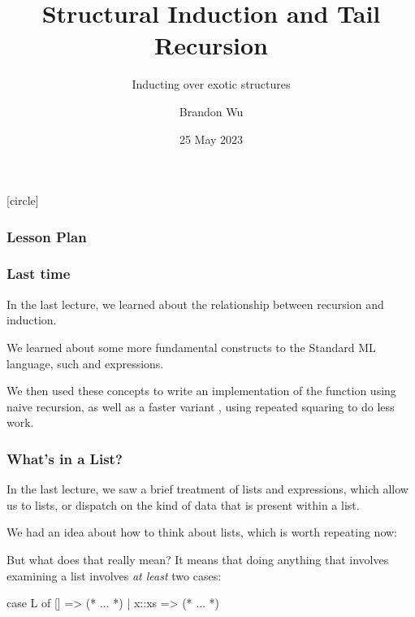 \documentclass[aspectratio=169, handout]{beamer}
\title{Structural Induction and Tail Recursion} %
\subtitle{Inducting over exotic structures} %
\date{25 May 2023} %
\author{Brandon Wu} %
\newif\ifcolorlambda
\begin{document}
\ifweb
\renewcommand{\pause}{}
\fi

[circle]

{
\begin{frame}[plain]
\colorlambdatrue
\titlepage
\end{frame}
}

\begin{frame}[fragile]
\frametitle{Lesson Plan}

\tableofcontents
\end{frame}

\begin{frame}[fragile]
  \frametitle{Last time}

  In the last lecture, we learned about the relationship between recursion
  and induction.

  \pause
  \vspace{\fill}

  We learned about some more fundamental constructs to the Standard ML language, such
   and  expressions.

  \pause
  \vspace{\fill}

  We then used these concepts to write an implementation of the  function
  using naive recursion, as well as a faster variant , using
  repeated squaring to do less work.
\end{frame}


\begin{frame}[fragile]
  \frametitle{What's in a List?}

  In the last lecture, we saw a brief treatment of lists and 
  expressions, which allow us to  lists, or dispatch
  on the kind of data that is present within a list.

  \pause
  \vspace{\fill}

  We had an idea about how to think about lists, which is worth repeating now:

  \pause
  \vspace{5pt}


  \pause
  \vspace{\fill}

  But what does that really mean? It means that doing anything that involves
  examining a list involves \textit{at least} two cases:

  \begin{codeblock}
    case L of
      [] => (* ... *)
    | x::xs => (* ... *)
  \end{codeblock}
\end{frame}
\end{document}
